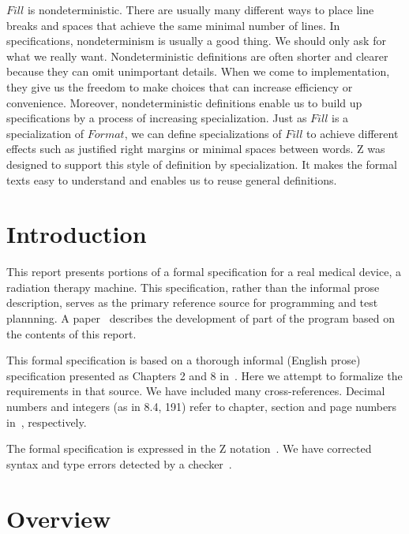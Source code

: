 \documentclass{article}
\begin{document}
$Fill$ is nondeterministic.  There are usually many different ways to
place line breaks and spaces that achieve the same minimal number of
lines.  In specifications, nondeterminism is usually a good thing.  We
should only ask for what we really want.  Nondeterministic definitions
are often shorter and clearer because they can omit unimportant
details.  When we come to implementation, they give us the freedom to
make choices that can increase efficiency or convenience.  Moreover,
nondeterministic definitions enable us to build up specifications by a
process of increasing specialization.  Just as $Fill$ is a
specialization of $Format$, we can define specializations of $Fill$ to
achieve different effects such as justified right margins or minimal
spaces between words.  Z was designed to support this style of
definition by specialization.  It makes the formal texts easy to
understand and enables us to reuse general definitions.












\section{Introduction}

This report presents portions of a formal specification for a real
medical device, a radiation therapy machine. This specification,
rather than the informal prose description, serves as the primary
reference source for programming and test plannning.  A
paper~\cite{jacky95b} describes the development of part of the program
based on the contents of this report.

This formal specification is based on a thorough informal (English
prose) specification presented as Chapters 2 and 8 in~\cite{jacky92}.
Here we attempt to formalize the requirements in that
source.  We have included many cross-references.  Decimal numbers and
integers (as in 8.4, 191) refer to chapter, section and page numbers
in~\cite{jacky92}, respectively.

The formal specification is expressed in the Z
notation~\cite{spivey92}.  We have corrected syntax and type errors
detected by a checker~\cite{spivey92a}.

\section{Overview} 
\end{document}
